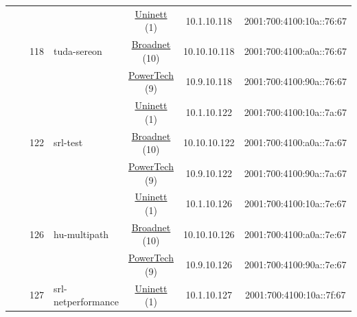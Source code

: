 \begin{small}
\begin{center}
\begin{longtable}{|c|c|c|c|c|c|c|c|}
  &  & \multirow{3}{*}{\tiny{118}} & \multicolumn{1}{|l|}{\multirow{3}{*}{\tiny{tuda-sereon}}} & \multicolumn{2}{|c|}{\tiny{\href{https://www.uninett.no}{Uninett} (1)}} & \tiny{10.1.10.118} & \tiny{2001:700:4100:10a::76:67} \\* \cline{5-5}\cline{6-6}\cline{7-7}\cline{8-8}
  &  &  &  & \multicolumn{2}{|c|}{\tiny{\href{https://www.broadnet.no}{Broadnet} (10)}} & \tiny{10.10.10.118} & \tiny{2001:700:4100:a0a::76:67} \\* \cline{5-5}\cline{6-6}\cline{7-7}\cline{8-8}
  &  &  &  & \multicolumn{2}{|c|}{\tiny{\href{http://www.powertech.no}{PowerTech} (9)}} & \tiny{10.9.10.118} & \tiny{2001:700:4100:90a::76:67} \\* \cline{3-3}\cline{4-4}\cline{5-5}\cline{6-6}\cline{7-7}\cline{8-8}
  &  & \multirow{3}{*}{\tiny{122}} & \multicolumn{1}{|l|}{\multirow{3}{*}{\tiny{srl-test}}} & \multicolumn{2}{|c|}{\tiny{\href{https://www.uninett.no}{Uninett} (1)}} & \tiny{10.1.10.122} & \tiny{2001:700:4100:10a::7a:67} \\* \cline{5-5}\cline{6-6}\cline{7-7}\cline{8-8}
  &  &  &  & \multicolumn{2}{|c|}{\tiny{\href{https://www.broadnet.no}{Broadnet} (10)}} & \tiny{10.10.10.122} & \tiny{2001:700:4100:a0a::7a:67} \\* \cline{5-5}\cline{6-6}\cline{7-7}\cline{8-8}
  &  &  &  & \multicolumn{2}{|c|}{\tiny{\href{http://www.powertech.no}{PowerTech} (9)}} & \tiny{10.9.10.122} & \tiny{2001:700:4100:90a::7a:67} \\* \cline{3-3}\cline{4-4}\cline{5-5}\cline{6-6}\cline{7-7}\cline{8-8}
  &  & \multirow{3}{*}{\tiny{126}} & \multicolumn{1}{|l|}{\multirow{3}{*}{\tiny{hu-multipath}}} & \multicolumn{2}{|c|}{\tiny{\href{https://www.uninett.no}{Uninett} (1)}} & \tiny{10.1.10.126} & \tiny{2001:700:4100:10a::7e:67} \\* \cline{5-5}\cline{6-6}\cline{7-7}\cline{8-8}
  &  &  &  & \multicolumn{2}{|c|}{\tiny{\href{https://www.broadnet.no}{Broadnet} (10)}} & \tiny{10.10.10.126} & \tiny{2001:700:4100:a0a::7e:67} \\* \cline{5-5}\cline{6-6}\cline{7-7}\cline{8-8}
  &  &  &  & \multicolumn{2}{|c|}{\tiny{\href{http://www.powertech.no}{PowerTech} (9)}} & \tiny{10.9.10.126} & \tiny{2001:700:4100:90a::7e:67} \\* \cline{3-3}\cline{4-4}\cline{5-5}\cline{6-6}\cline{7-7}\cline{8-8}
  &  & \multirow{3}{*}{\tiny{127}} & \multicolumn{1}{|l|}{\multirow{3}{*}{\tiny{srl-netperformance}}} & \multicolumn{2}{|c|}{\tiny{\href{https://www.uninett.no}{Uninett} (1)}} & \tiny{10.1.10.127} & \tiny{2001:700:4100:10a::7f:67} \\* \cline{5-5}\cline{6-6}\cline{7-7}\cline{8-8}

\end{longtable}
\end{center}
\end{small}
